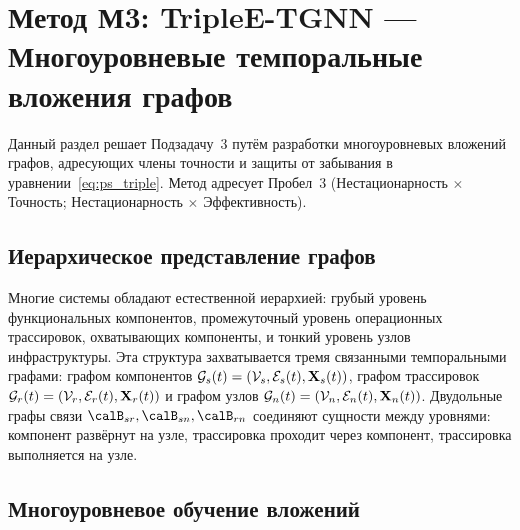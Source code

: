 \section{Метод М3: TripleE-TGNN --- Многоуровневые темпоральные вложения графов}
\label{sec:triple_e}

Данный раздел решает Подзадачу~3 путём разработки многоуровневых вложений графов, адресующих члены точности и защиты от забывания в уравнении~\eqref{eq:ps_triple}. Метод адресует Пробел~3 (Нестационарность $\times$ Точность; Нестационарность $\times$ Эффективность).

\subsection{Иерархическое представление графов}

Многие системы обладают естественной иерархией: грубый уровень функциональных компонентов, промежуточный уровень операционных трассировок, охватывающих компоненты, и тонкий уровень узлов инфраструктуры. Эта структура захватывается тремя связанными темпоральными графами: графом компонентов $\mathcal{G}_s(t)=(\mathcal{V}_s,\mathcal{E}_s(t),\mathbf{X}_s(t))$, графом трассировок $\mathcal{G}_r(t)=(\mathcal{V}_r,\mathcal{E}_r(t),\mathbf{X}_r(t))$ и графом узлов $\mathcal{G}_n(t)=(\mathcal{V}_n,\mathcal{E}_n(t),\mathbf{X}_n(t))$. Двудольные графы связи $\calB_{sr},\calB_{sn},\calB_{rn}$ соединяют сущности между уровнями: компонент развёрнут на узле, трассировка проходит через компонент, трассировка выполняется на узле.

\subsection{Многоуровневое обучение вложений}

